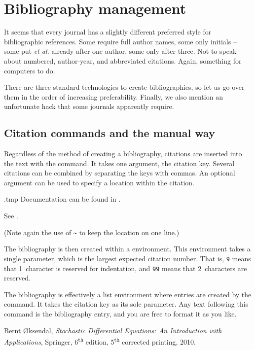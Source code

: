 %
%
%
\section{Bibliography management}\label{sec:bibliography}

It seems that every journal has a slightly different preferred style for bibliographic references.
Some require full author names, some only initials
-- some put \emph{et al.} already after one author, some only after three.
Not to speak about numbered, author-year, and abbreviated citations.
Again, something for computers to do.

There are three standard technologies to create bibliographies,
so let us go over them in the order of increasing preferability.
Finally, we also mention an unfortunate hack that some journals apparently require.

%
\subsection{Citation commands and the manual way}\label{sec:bibliography manual}

Regardless of the method of creating a bibliography,
citations are inserted into the text with the  command.
It takes one argument, the citation key.
Several citations can be combined by separating the keys with commas.
An optional argument can be used to specify a location within the citation.

\begin{VerbatimOut}{\jobname.tmp}
Documentation can be found in
\cite{TLC, tikz}.

See \cite[Chapter~8]{TLC}.
\end{VerbatimOut}
\ShowExample
(Note again the use of \verb|~| to keep the location on one line.)

The bibliography is then created within a  environment.
This environment takes a single parameter,
which is the largest expected citation number.
That is, \verb|9| means that 1~character is reserved for indentation,
and \verb|99| means that 2~characters are reserved.

The bibliography is effectively a list environment
where entries are created by the  command.
It takes the citation key as its sole parameter.
Any text following this command is the bibliography entry,
and you are free to format it as you like.

\begin{ExampleCode}
\begin{thebibliography}{9}

    Bernt \O{}ksendal,
    \textit{Stochastic Differential Equations:
    An Introduction with Applications},
    Springer,
    6\textsuperscript{th} edition, 5\textsuperscript{th} corrected printing,
    2010.

\end{thebibliography}
\end{ExampleCode}

